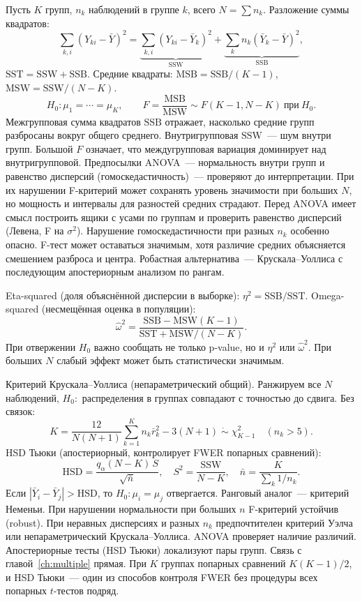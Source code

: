 Пусть $K$ групп, $n_k$ наблюдений в группе $k$, всего $N=\sum n_k$.
Разложение суммы квадратов: \[ \sum_{k,i}(Y_{ki}-\bar Y)^2= \underbrace{\sum_{k,i}(Y_{ki}-\bar Y_k)^2}_{\mathrm{SSW}}+ \underbrace{\sum_k n_k(\bar Y_k-\bar Y)^2}_{\mathrm{SSB}}, \] $\mathrm{SST}=\mathrm{SSW}+\mathrm{SSB}$.
Средние квадраты: $\mathrm{MSB}=\mathrm{SSB}/(K-1)$, $\mathrm{MSW}=\mathrm{SSW}/(N-K)$.
\[ H_0\colon \mu_1=\cdots=\mu_K,\qquad F=\frac{\mathrm{MSB}}{\mathrm{MSW}}\sim F(K-1,N-K)\ \text{при}\ H_0.
\] Межгрупповая сумма квадратов $\mathrm{SSB}$ отражает, насколько средние групп разбросаны вокруг общего среднего. Внутригрупповая $\mathrm{SSW}$~--- шум внутри групп. Большой $F$ означает, что междугрупповая вариация доминирует над внутригрупповой.
Предпосылки ANOVA~--- нормальность внутри групп и равенство дисперсий (гомоскедастичность)~--- проверяют до интерпретации. При их нарушении F-критерий может сохранять уровень значимости при больших $N$, но мощность и интервалы для разностей средних страдают.
Перед ANOVA имеет смысл построить ящики с усами по группам и проверить равенство дисперсий (Левена, F на $\sigma^2$). Нарушение гомоскедастичности при разных $n_k$ особенно опасно. F-тест может оставаться значимым, хотя различие средних объясняется смешением разброса и центра.
Робастная альтернатива~--- Крускала--Уоллиса с последующим апостериорным анализом по рангам.

\begin{definition}
Eta-squared (доля объяснённой дисперсии в выборке): $\eta^2=\mathrm{SSB}/\mathrm{SST}$.
Omega-squared (несмещённая оценка в популяции): \[ \hat\omega^2=\frac{\mathrm{SSB}-\mathrm{MSW}(K-1)} {\mathrm{SST}+\mathrm{MSW}/(N-K)}.
\] При отвержении $H_0$ важно сообщать не только p-value, но и $\eta^2$ или $\hat\omega^2$. При больших $N$ слабый эффект может быть статистически значимым.
\end{definition}

Критерий Крускала--Уоллиса (непараметрический общий). Ранжируем все $N$ наблюдений, $H_0\colon$ распределения в группах совпадают с точностью до сдвига. Без связок: \[ K=\frac{12}{N(N+1)}\sum_{k=1}^K n_k\bar r_k^2-3(N+1) \;\dot\sim\;\chi^2_{K-1}\quad (n_k>5).
\] HSD Тьюки (апостериорный, контролирует FWER попарных сравнений): \[ \mathrm{HSD}=\frac{q_\alpha(N-K)\,S}{\sqrt{\bar n}}, \quad S^2=\frac{\mathrm{SSW}}{N-K}, \quad \bar n=\frac{K}{\sum_k 1/n_k}.
\] Если $|\bar Y_i-\bar Y_j|>\mathrm{HSD}$, то $H_0\colon\mu_i=\mu_j$ отвергается. Ранговый аналог~--- критерий Неменьи.
При нарушении нормальности при больших $n$ F-критерий устойчив (robust). При неравных дисперсиях и разных $n_k$ предпочтителен критерий Уэлча или непараметрический Крускала--Уоллиса.
ANOVA проверяет наличие различий. Апостериорные тесты (HSD Тьюки) локализуют пары групп.
Связь с главой~\ref{ch:multiple} прямая. При $K$ группах попарных сравнений $K(K-1)/2$, и HSD Тьюки~--- один из способов контроля FWER без процедуры всех попарных $t$-тестов подряд.

